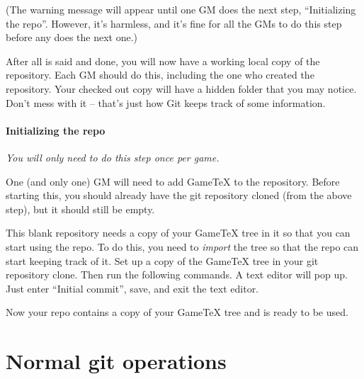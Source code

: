 \documentclass[green]{testgame}
\begin{document}
(The warning message will appear until one GM does the next step, ``Initializing the repo''. However, it's harmless, and it's fine for all the GMs to do this step before any does the next one.)

After all is said and done, you will now have a working local copy of the
repository.  Each GM should do this, including the one who created the
repository. Your checked out copy will have a hidden  folder that
you may notice.  Don't mess with it -- that's just how Git keeps track of some
information.

\paragraph*{Initializing the repo} \emph{You will only need to do this step once per game.}

One (and only one) GM will need to add GameTeX to the repository. Before starting this, you should already have the git repository cloned (from the above step), but it should still be empty.

This blank repository needs a copy of your GameTeX tree in it so that you can
start using the repo. To do this, you need to \emph{import} the tree so that
the repo can start keeping track of it. Set up a copy of the GameTeX tree in
your git repository clone. Then run the following commands. A text editor will
pop up. Just enter ``Initial commit'', save, and exit the text editor.


Now your repo contains a copy of your GameTeX tree and is ready to be
used.

\section{Normal git operations}
\end{document}
